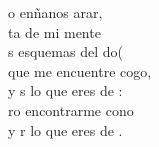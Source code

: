 \begin{cancion}%
	o enñanos arar, \\
	ta de mi mente\\
	s esquemas del do(  \\
	que me encuentre cogo,\\
	y s lo que eres de :\\
	ro encontrarme cono\\
	y r lo que eres de .\\
\end{cancion}%
